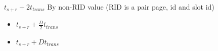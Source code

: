 \begin{itemize}
\begin{itemize}
\begin{itemize}
                     $t_{s+r} + 2t_{trans}$
                     By non-RID value (RID is a pair page, id and slot id)
                        \begin{itemize}
                            \item $t_{s+r} + \frac{D}{2}t_{trans}$
                        \end{itemize}
                        \begin{itemize}
                            \item $t_{s+r} + Dt_{trans}$
                        \end{itemize}
                \end{itemize}
            \end{itemize}
\end{itemize}

